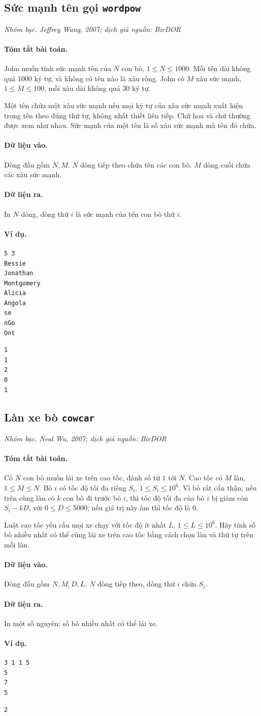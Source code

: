 \documentclass[11pt]{article}
\newcommand{\problem}[4]{%
  \subsection[#1 (#2)]{#1 \hfill {\normalsize\texttt{#2}}}%
  \noindent\textit{#3. #4}\par\smallskip
}
\newcommand{\iosec}[1]{\paragraph{#1}}
\begin{document}
\problem{Sức mạnh tên gọi}{wordpow}{Nhóm bạc}{Jeffrey Wang, 2007; dịch giả nguồn: BirDOR}

\iosec{Tóm tắt bài toán.}
John muốn tính sức mạnh tên của \(N\) con bò, \(1\le N\le 1000\). Mỗi tên dài
không quá \(1000\) ký tự, và không có tên nào là xâu rỗng. John có \(M\) xâu
sức mạnh, \(1\le M\le 100\), mỗi xâu dài không quá \(30\) ký tự.

Một tên chứa một xâu sức mạnh nếu mọi ký tự của xâu sức mạnh xuất hiện trong
tên theo đúng thứ tự, không nhất thiết liên tiếp. Chữ hoa và chữ thường được
xem như nhau. Sức mạnh của một tên là số xâu sức mạnh mà tên đó chứa.

\iosec{Dữ liệu vào.}
Dòng đầu gồm \(N,M\). \(N\) dòng tiếp theo chứa tên các con bò. \(M\) dòng
cuối chứa các xâu sức mạnh.

\iosec{Dữ liệu ra.}
In \(N\) dòng, dòng thứ \(i\) là sức mạnh của tên con bò thứ \(i\).

\iosec{Ví dụ.}
\begin{verbatim}
5 3
Bessie
Jonathan
Montgomery
Alicia
Angola
se
nGo
Ont
\end{verbatim}

\begin{verbatim}
1
1
2
0
1
\end{verbatim}

\problem{Làn xe bò}{cowcar}{Nhóm bạc}{Neal Wu, 2007; dịch giả nguồn: BirDOR}

\iosec{Tóm tắt bài toán.}
Có \(N\) con bò muốn lái xe trên cao tốc, đánh số từ \(1\) tới \(N\). Cao tốc
có \(M\) làn, \(1\le M\le N\). Bò \(i\) có tốc độ tối đa riêng \(S_i\),
\(1\le S_i\le 10^6\). Vì bò rất cẩn thận, nếu trên cùng làn có \(k\) con bò
đi trước bò \(i\), thì tốc độ tối đa của bò \(i\) bị giảm còn
\(S_i-kD\), với \(0\le D\le 5000\); nếu giá trị này âm thì tốc độ là \(0\).

Luật cao tốc yêu cầu mọi xe chạy với tốc độ ít nhất \(L\),
\(1\le L\le 10^6\). Hãy tính số bò nhiều nhất có thể cùng lái xe trên cao tốc
bằng cách chọn làn và thứ tự trên mỗi làn.

\iosec{Dữ liệu vào.}
Dòng đầu gồm \(N,M,D,L\). \(N\) dòng tiếp theo, dòng thứ \(i\) chứa \(S_i\).

\iosec{Dữ liệu ra.}
In một số nguyên: số bò nhiều nhất có thể lái xe.

\iosec{Ví dụ.}
\begin{verbatim}
3 1 1 5
5
7
5
\end{verbatim}

\begin{verbatim}
2
\end{verbatim}
\end{document}
